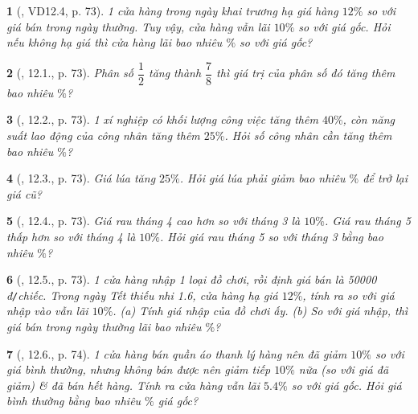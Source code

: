 \documentclass{article}
\newtheorem{baitoan}{}
\begin{document}
\begin{baitoan}[\cite{TLCT_THCS_Toan_6_so_hoc}, VD12.4, p. 73]
	1 cửa hàng trong ngày khai trương hạ giá hàng $12\%$ so với giá bán trong ngày thường. Tuy vậy, cửa hàng vẫn lãi $10\%$ so với giá gốc. Hỏi nếu không hạ giá thì cửa hàng lãi bao nhiêu $\%$ so với giá gốc?
\end{baitoan}

\begin{baitoan}[\cite{TLCT_THCS_Toan_6_so_hoc}, 12.1., p. 73]
	Phân số $\dfrac{1}{2}$ tăng thành $\dfrac{7}{8}$ thì giá trị của phân số đó tăng thêm bao nhiêu $\%$?
\end{baitoan}

\begin{baitoan}[\cite{TLCT_THCS_Toan_6_so_hoc}, 12.2., p. 73]
	1 xí nghiệp có khối lượng công việc tăng thêm $40\%$, còn năng suất lao động của công nhân tăng thêm $25\%$. Hỏi số công nhân cần tăng thêm bao nhiêu $\%$?
\end{baitoan}

\begin{baitoan}[\cite{TLCT_THCS_Toan_6_so_hoc}, 12.3., p. 73]
	Giá lúa tăng $25\%$. Hỏi giá lúa phải giảm bao nhiêu $\%$ để trở lại giá cũ?
\end{baitoan}

\begin{baitoan}[\cite{TLCT_THCS_Toan_6_so_hoc}, 12.4., p. 73]
	Giá rau tháng 4 cao hơn so với tháng 3 là $10\%$. Giá rau tháng 5 thấp hơn so với tháng 4 là $10\%$. Hỏi giá rau tháng 5 so với tháng 3 bằng bao nhiêu $\%$?
\end{baitoan}

\begin{baitoan}[\cite{TLCT_THCS_Toan_6_so_hoc}, 12.5., p. 73]
	1 cửa hàng nhập 1 loại đồ chơi, rồi định giá bán là {\rm50000 đ{\tt/}chiếc}. Trong ngày Tết thiếu nhi 1.6, cửa hàng hạ giá $12\%$, tính ra so với giá nhập vào vẫn lãi $10\%$. (a) Tính giá nhập của đồ chơi ấy. (b) So với giá nhập, thì giá bán trong ngày thường lãi bao nhiêu $\%$?
\end{baitoan}

\begin{baitoan}[\cite{TLCT_THCS_Toan_6_so_hoc}, 12.6., p. 74]
	1 cửa hàng bán quần áo thanh lý hàng nên đã giảm $10\%$ so với giá bình thường, nhưng không bán được nên giảm tiếp $10\%$ nữa (so với giá đã giảm) \& đã bán hết hàng. Tính ra cửa hàng vẫn lãi $5.4\%$ so với giá gốc. Hỏi giá bình thường bằng bao nhiêu $\%$ giá gốc?
\end{baitoan}
\end{document}
